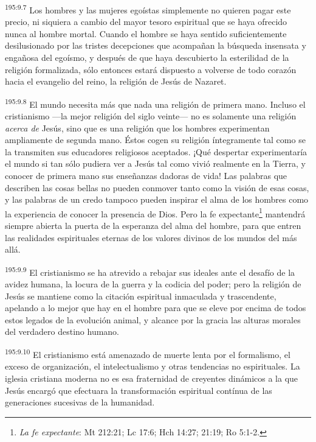\par 
\textsuperscript{195:9.7} Los hombres y las mujeres egoístas simplemente no quieren pagar este precio, ni siquiera a cambio del mayor tesoro espiritual que se haya ofrecido nunca al hombre mortal. Cuando el hombre se haya sentido suficientemente desilusionado por las tristes decepciones que acompañan la búsqueda insensata y engañosa del egoísmo, y después de que haya descubierto la esterilidad de la religión formalizada, sólo entonces estará dispuesto a volverse de todo corazón hacia el evangelio del reino, la religión de Jesús de Nazaret.

\par 
\textsuperscript{195:9.8} El mundo necesita más que nada una religión de primera mano. Incluso el cristianismo ---la mejor religión del siglo veinte--- no es solamente una religión \textit{acerca de} Jesús, sino que es una religión que los hombres experimentan ampliamente de segunda mano. Éstos cogen su religión íntegramente tal como se la transmiten sus educadores religiosos aceptados. ¡Qué despertar experimentaría el mundo si tan sólo pudiera ver a Jesús tal como vivió realmente en la Tierra, y conocer de primera mano sus enseñanzas dadoras de vida! Las palabras que describen las cosas bellas no pueden conmover tanto como la visión de esas cosas, y las palabras de un credo tampoco pueden inspirar el alma de los hombres como la experiencia de conocer la presencia de Dios. Pero la fe expectante\footnote{\textit{La fe expectante}: Mt 212:21; Lc 17:6; Hch 14:27; 21:19; Ro 5:1-2.} mantendrá siempre abierta la puerta de la esperanza del alma del hombre, para que entren las realidades espirituales eternas de los valores divinos de los mundos del más allá.

\par 
\textsuperscript{195:9.9} El cristianismo se ha atrevido a rebajar sus ideales ante el desafío de la avidez humana, la locura de la guerra y la codicia del poder; pero la religión de Jesús se mantiene como la citación espiritual inmaculada y trascendente, apelando a lo mejor que hay en el hombre para que se eleve por encima de todos estos legados de la evolución animal, y alcance por la gracia las alturas morales del verdadero destino humano.

\par 
\textsuperscript{195:9.10} El cristianismo está amenazado de muerte lenta por el formalismo, el exceso de organización, el intelectualismo y otras tendencias no espirituales. La iglesia cristiana moderna no es esa fraternidad de creyentes dinámicos a la que Jesús encargó que efectuara la transformación espiritual contínua de las generaciones sucesivas de la humanidad.

